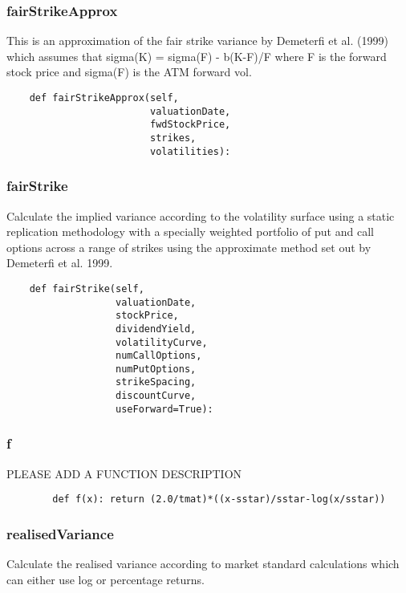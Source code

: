 \documentclass[twoside,11pt]{book}
\begin{document}
\subsubsection*{{\bf fairStrikeApprox}}
This is an approximation of the fair strike variance by Demeterfi et al. (1999) which assumes that sigma(K) = sigma(F) - b(K-F)/F where F is the forward stock price and sigma(F) is the ATM forward vol.  

\begin{lstlisting}
    def fairStrikeApprox(self,
                         valuationDate,
                         fwdStockPrice,
                         strikes,
                         volatilities):
\end{lstlisting}

\subsubsection*{{\bf fairStrike}}
Calculate the implied variance according to the volatility surface using a static replication methodology with a specially weighted portfolio of put and call options across a range of strikes using the approximate method set out by Demeterfi et al. 1999.  

\begin{lstlisting}
    def fairStrike(self,
                   valuationDate,
                   stockPrice,
                   dividendYield,
                   volatilityCurve,
                   numCallOptions,
                   numPutOptions,
                   strikeSpacing,
                   discountCurve,
                   useForward=True):
\end{lstlisting}

\subsubsection*{{\bf f}}
PLEASE ADD A FUNCTION DESCRIPTION

\begin{lstlisting}
        def f(x): return (2.0/tmat)*((x-sstar)/sstar-log(x/sstar))
\end{lstlisting}

\subsubsection*{{\bf realisedVariance}}
Calculate the realised variance according to market standard calculations which can either use log or percentage returns. 
\end{document}

